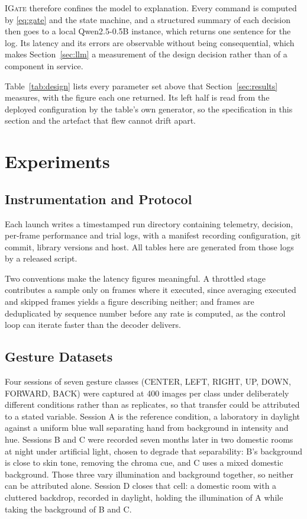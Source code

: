 \documentclass[conference]{IEEEtran}
\newcommand{\method}[1]{\textsc{#1}}
\begin{document}
\method{IGate} therefore confines the model to explanation. Every command is
computed by \eqref{eq:gate} and the state machine, and a structured summary of
each decision then goes to a local Qwen2.5-0.5B instance, which returns one
sentence for the log. Its latency and its errors are observable without being
consequential, which makes Section~\ref{sec:llm} a measurement of the design
decision rather than of a component in service.

Table~\ref{tab:design} lists every parameter set above that
Section~\ref{sec:results} measures, with the figure each one returned. Its left
half is read from the deployed configuration by the table's own generator, so
the specification in this section and the artefact that flew cannot drift
apart.



\section{Experiments}
\label{sec:setup}

\subsection{Instrumentation and Protocol}

Each launch writes a timestamped run directory containing telemetry, decision,
per-frame performance and trial logs, with a manifest recording configuration,
git commit, library versions and host. All tables here are generated from those
logs by a released script.

Two conventions make the latency figures meaningful. A throttled stage
contributes a sample only on frames where it executed, since averaging executed
and skipped frames yields a figure describing neither; and frames are deduplicated
by sequence number before any rate is computed, as the control loop can iterate
faster than the decoder delivers.

\subsection{Gesture Datasets}

Four sessions of seven gesture classes (CENTER, LEFT, RIGHT, UP, DOWN, FORWARD,
BACK) were captured at 400 images per class under deliberately different
conditions rather than as replicates, so that transfer could be attributed to a
stated variable. Session A is the reference condition, a laboratory in daylight
against a uniform blue wall separating hand from background in intensity and hue.
Sessions B and C were recorded seven months later in two domestic rooms at night
under artificial light, chosen to degrade that separability: B's background is
close to skin tone, removing the chroma cue, and C uses a mixed domestic
background. Those three vary illumination and background together, so neither can
be attributed alone. Session D closes that cell: a domestic room with a cluttered
backdrop, recorded in daylight, holding the illumination of A while taking the
background of B and C.
\end{document}
